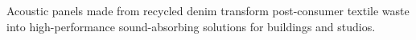 Acoustic panels made from recycled denim transform post-consumer textile waste into high-performance sound-absorbing solutions for buildings and studios.

